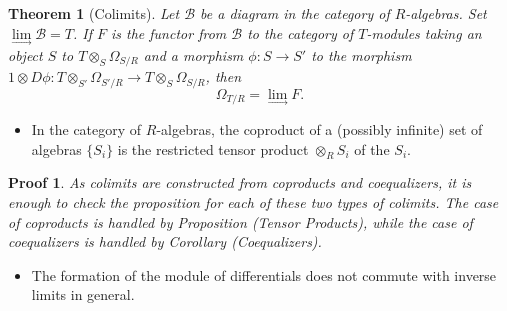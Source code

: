 \documentclass{beamer}
\newtheorem{thm}{Theorem}
\newtheorem{prf}{Proof}
\begin{document}
\begin{frame}
\begin{small}

\begin{thm}[Colimits]
Let $\mathcal{B}$ be a diagram in the category of $R$-algebras. Set $\lim\limits_{\rightarrow} \mathcal{B} = T$. If $F$ is the functor from $\mathcal{B}$ to the category of $T$-modules taking an object $S$ to $T\otimes_S\Omega_{S/R}$ and a morphism $\phi:S\to S'$ to the morphism $1\otimes D\phi: T\otimes_{S'}\Omega_{S'/R}\to T\otimes_S\Omega_{S/R}$, then 
$$\Omega_{T/R} = \lim_{\to} F.$$
\end{thm}

\begin{itemize}
\item In the category of $R$-algebras, the coproduct of a (possibly infinite) set of algebras $\{S_i\}$ is the restricted tensor product $\otimes_RS_i$ of the $S_i.$

\end{itemize}

\begin{prf}
As colimits are constructed from coproducts and coequalizers, it is enough to check the proposition for each of these two types of colimits. The case of coproducts is handled by Proposition (Tensor Products), while the case of coequalizers is handled by Corollary (Coequalizers).
\end{prf}

\begin{itemize}
\item The formation of the module of differentials does not commute with inverse limits in general.
\end{itemize}

\end{small}
\end{frame}



\end{document}
